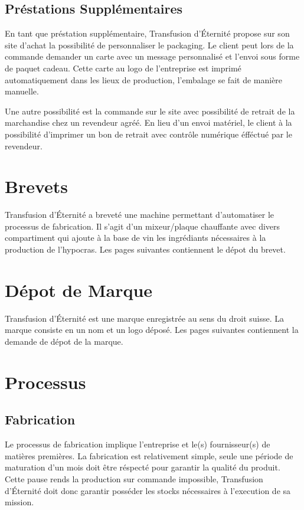\documentclass[10pt,a4paper]{article}
\newcommand{\tde}{Transfusion d'Éternité}
\begin{document}
\subsection{Préstations Supplémentaires}
En tant que préstation supplémentaire, \tde{} propose sur son site d'achat la possibilité de personnaliser le packaging.
Le client peut lors de la commande demander un carte avec un message personnalisé et l'envoi sous forme de paquet cadeau.
Cette carte au logo de l'entreprise est imprimé automatiquement dans les lieux de production, l'embalage se fait de manière manuelle.

Une autre possibilité est la commande sur le site avec possibilité de retrait de la marchandise chez un revendeur agréé.
En lieu d'un envoi matériel, le client à la possibilité d'imprimer un bon de retrait avec contrôle numérique éfféctué par le revendeur.
\section{Brevets}
\tde{} a breveté une machine permettant d'automatiser le processus de fabrication.
Il s'agit d'un mixeur/plaque chauffante avec divers compartiment qui ajoute à la base de vin les ingrédiants nécessaires à la production de l'hypocras.
Les pages suivantes contiennent le dépot du brevet.


\section{Dépot de Marque}
\tde{} est une marque enregistrée au sens du droit suisse.
La marque consiste en un nom et un logo déposé.
Les pages suivantes contiennent la demande de dépot de la marque.


\section{Processus}

\subsection{Fabrication}
Le processus de fabrication implique l'entreprise et le(s) fournisseur(s) de matières premières.
La fabrication est relativement simple, seule une période de maturation d'un mois doit être réspecté pour garantir la qualité du produit.
Cette pause rends la production sur commande impossible, \tde{} doit donc garantir posséder les stocks nécessaires à l'execution de sa mission.
\end{document}
